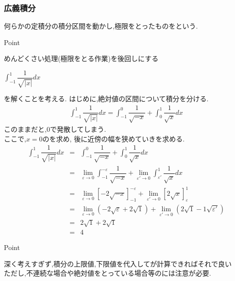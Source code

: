 \documentclass[a4paper]{jsarticle}
\begin{document}
\subsubsection{広義積分}
何らかの定積分の積分区間を動かし,極限をとったものをという.\\
\begin{itembox}[l]{Point}
    \begin{center}
        めんどくさい処理(極限をとる作業)を後回しにする
    \end{center}
\end{itembox}
\begin{center}
    $\displaystyle\int ^1_{-1} \dfrac{1}{\sqrt{|x|}}dx$
\end{center}
を解くことを考える.
はじめに,絶対値の区間について積分を分ける.
\begin{eqnarray*}
    \displaystyle\int ^1_{-1} \dfrac{1}{\sqrt{|x|}}dx=\int ^0_{-1} \dfrac{1}{\sqrt{-x}}+\int ^1_{0} \dfrac{1}{\sqrt{x}}dx
\end{eqnarray*}
このままだと,$0$で発散してしまう.\\
ここで,$x=0$のを求め,
後に近傍の幅を狭めていきを求める.
\begin{eqnarray*}
    \displaystyle
    \int ^1_{-1} \dfrac{1}{\sqrt{|x|}}dx&=&\int ^0_{-1} \dfrac{1}{\sqrt{-x}}+\int ^1_{0} \dfrac{1}{\sqrt{x}}dx\\
    &=&\lim_{\varepsilon\rightarrow 0}\int ^{-\varepsilon}_{-1} \dfrac{1}{\sqrt{-x}}+\lim_{\varepsilon'\rightarrow 0}\int ^1_{\varepsilon'} \dfrac{1}{\sqrt{x}}dx\\
    &=&\lim_{\varepsilon\rightarrow 0}\left[-2\sqrt{-x}\right]^{-\varepsilon}_{-1}+\lim_{\varepsilon'\rightarrow0}\left[2\sqrt{x}\right]^{1}_{\varepsilon}\\
    &=&\lim_{\varepsilon\rightarrow 0}\left(-2\sqrt{\varepsilon}+2\sqrt{1}\right)+\lim_{\varepsilon'\rightarrow0}\left(2\sqrt{1}-1\sqrt{\varepsilon'}\right)\\
    &=&2\sqrt{1}+2\sqrt{1}\\
    &=&4
\end{eqnarray*}
\begin{itembox}[l]{Point}
    \begin{center}
        深く考えすぎず,積分の上限値,下限値を代入してが計算できればそれで良い\\
        ただし,不連続な場合や絶対値をとっている場合等のには注意が必要.
    \end{center}
\end{itembox}
\end{document}
